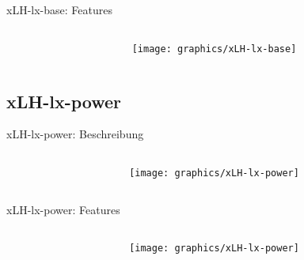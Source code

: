 \documentclass[10pt]{beamer}
\begin{document}
            \begin{frame}{xLH-lx-base: Features}
                \begin{columns}
                    \begin{column}{0.75\textwidth}
                        
                    \end{column}
                    \begin{column}{0.25\textwidth}
                        \begin{figure}[h]
                            \centering
                            \texttt{[image: graphics/xLH-lx-base]}
                        \end{figure}
                    \end{column}
                \end{columns}

            \end{frame}

        \subsection{xLH-lx-power}
            \begin{frame}{xLH-lx-power: Beschreibung}
                \begin{columns}
                    \begin{column}{0.75\textwidth}
                        
                    \end{column}
                    \begin{column}{0.25\textwidth}
                        \begin{figure}[h]
                            \centering
                            \texttt{[image: graphics/xLH-lx-power]}
                        \end{figure}
                    \end{column}
                \end{columns}
            \end{frame}

            \begin{frame}{xLH-lx-power: Features}
                \begin{columns}
                    \begin{column}{0.75\textwidth}
                        
                    \end{column}
                    \begin{column}{0.25\textwidth}
                        \begin{figure}[h]
                            \centering
                            \texttt{[image: graphics/xLH-lx-power]}
                        \end{figure}
                    \end{column}
                \end{columns}
            \end{frame}
\end{document}
